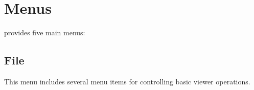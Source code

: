 \documentclass[english]{article}
\begin{document}

\section{Menus}

 provides five main menus:


\subsection{File}
This menu includes several menu items for controlling basic viewer operations.
\end{document}

